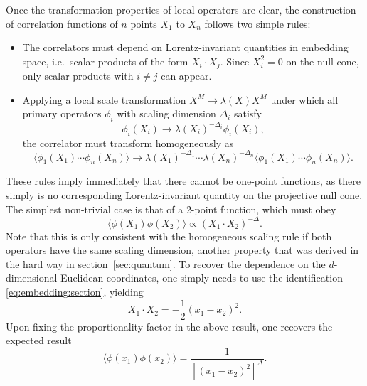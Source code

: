 \documentclass[a4paper,12pt]{article}
\numberwithin{equation}{section}
\begin{document}
Once the transformation properties of local operators are clear, the construction of correlation functions of $n$ points $X_1$ to $X_n$ follows two simple rules:
\begin{itemize}

\item
The correlators must depend on Lorentz-invariant quantities in embedding space, i.e.~scalar products of the form $X_i \cdot X_j$. Since $X_i^2 = 0$ on the null cone, only scalar products with $i \neq j$ can appear.

\item
Applying a local scale transformation $X^M \to \lambda(X) X^M$ under which all primary operators $\phi_i$ with scaling dimension $\Delta_i$ satisfy
\begin{equation}
	\phi_i(X_i) \to \lambda(X_i)^{-\Delta_i} \phi_i(X_i),
\end{equation} 
the correlator must transform homogeneously as
\begin{equation}
	\langle \phi_1(X_1) \cdots \phi_n(X_n) \rangle
	\to \lambda(X_1)^{-\Delta_1} \cdots \lambda(X_n)^{-\Delta_n}
	\langle \phi_1(X_1) \cdots \phi_n(X_n) \rangle.
\end{equation}


\end{itemize}
%
These rules imply immediately that there cannot be one-point functions, as there simply is no corresponding Lorentz-invariant quantity on the projective null cone. The simplest non-trivial case is that of a 2-point function, which must obey
\begin{equation}
	\langle \phi(X_1) \phi(X_2) \rangle
	\propto (X_1 \cdot X_2)^{-\Delta}.
\end{equation}
Note that this is only consistent with the homogeneous scaling rule if both operators have the same scaling dimension, another property that was derived in the hard way in section~\ref{sec:quantum}.
To recover the dependence on the $d$-dimensional Euclidean coordinates, one simply needs to use the identification \eqref{eq:embedding:section}, yielding
\begin{equation}
	X_1 \cdot X_2
	= -\frac{1}{2} (x_1 - x_2)^2.
\end{equation}
Upon fixing the proportionality factor in the above result, one recovers the expected result
\begin{equation}
	\langle \phi(x_1) \phi(x_2) \rangle = 
	\frac{1}{\left[ (x_1 - x_2)^2 \right]^\Delta}.
\end{equation}
\end{document}
